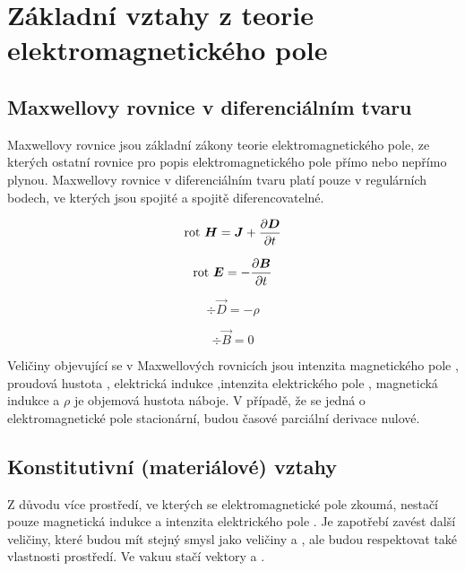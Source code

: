 \chapter{Základní vztahy z teorie elektromagnetického pole}
\label{zakladni_vztahy_z_teorie_elektromagnetickeho_pole}
\section{Maxwellovy rovnice v diferenciálním tvaru}
Maxwellovy rovnice jsou základní zákony teorie elektromagnetického pole, ze kterých ostatní rovnice pro popis elektromagnetického pole přímo nebo nepřímo plynou. Maxwellovy rovnice v diferenciálním tvaru platí pouze v regulárních bodech, ve kterých jsou spojité a spojitě diferencovatelné.

\begin{equation}
	\mathrm{rot}\  \mbox{\boldmath$H$} = \mbox{\boldmath$J$} + \frac{\partial \mbox{\boldmath$D$}}{\partial t}
	\label{prvni_maxwellova_rovnice}
\end{equation}

\begin{equation}
	\mathrm{rot}\  \mbox{\boldmath$E$} = - \frac{\partial \mbox{\boldmath$B$}}{\partial t}
	\label{druha_maxwellova_rovnice}
\end{equation}

\begin{equation}
	\div \vec{D} = - \rho
	\label{treti_maxwellova_rovnice}
\end{equation}

\begin{equation}
	\div \vec{B} = 0
	\label{ctvrta_maxwellova_rovnice}
\end{equation}

Veličiny objevující se v Maxwellových rovnicích jsou intenzita magnetického pole , proudová hustota , elektrická indukce ,intenzita elektrického pole , magnetická indukce   a $\rho$ je objemová hustota náboje.
	V případě, že se jedná o elektromagnetické pole stacionární, budou časové parciální derivace nulové.
	
\section{Konstitutivní (materiálové) vztahy}
Z důvodu více prostředí, ve kterých se elektromagnetické pole zkoumá, nestačí pouze magnetická indukce  a intenzita elektrického pole . Je zapotřebí zavést další veličiny, které budou mít stejný smysl jako veličiny  a , ale budou respektovat také vlastnosti prostředí. Ve vakuu stačí vektory  a .

